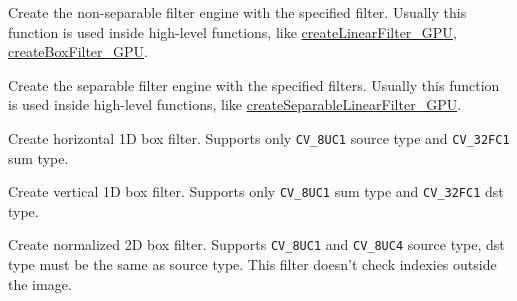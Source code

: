 \label{cppfunc.gpu.createFilter2D}
Create the non-separable filter engine with the specified filter.
Usually this function is used inside high-level functions, like \hyperref[cppfunc.gpu.createLinearFilter]{createLinearFilter\_GPU}, \hyperref[cppfunc.gpu.createBoxFilter]{createBoxFilter\_GPU}.

\label{cppfunc.gpu.createSeparableFilter}
Create the separable filter engine with the specified filters.
Usually this function is used inside high-level functions, like \hyperref[cppfunc.gpu.createSeparableLinearFilter]{createSeparableLinearFilter\_GPU}.

\label{cppfunc.gpu.getRowSumFilter}
Create horizontal 1D box filter. Supports only \texttt{CV\_8UC1} source type and \texttt{CV\_32FC1} sum type.

\label{cppfunc.gpu.getColumnSumFilter}
Create vertical 1D box filter. Supports only \texttt{CV\_8UC1} sum type and \texttt{CV\_32FC1} dst type.

\label{cppfunc.gpu.createBoxFilter}
Create normalized 2D box filter. Supports \texttt{CV\_8UC1} and \texttt{CV\_8UC4} source type, dst type must be the same as source type. This filter doesn't check indexies outside the image.

